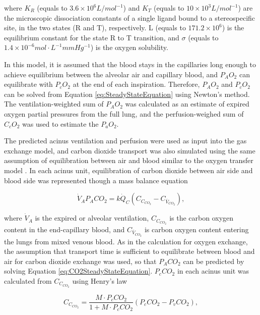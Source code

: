 \noindent where $K_R$ (equals to $3.6 \times 10^6 L/mol^{-1}$) and  $K_T$ (equals to $10 \times 10^3 L/mol^{-1}$) are the microscopic dissociation constants of a single ligand bound to a stereospecific site, in the two states (R and T), respectively. L (equals to $171.2 \times 10^6$) is the equilibrium constant for the state R to T transition, and $\sigma$ (equals to $1.4 \times 10^{-6} mol \cdot L^{-1}mm Hg^{-1}$) is the oxygen solubility.

In this model, it is assumed that the blood stays in the capillaries long enough to achieve equilibrium between the alveolar air and capillary blood, and $P_AO_2$ can equilibrate with $P_cO_2$ at the end of each inspiration. Therefore, $P_AO_2$ and $P_cO_2$ can be solved from Equation \ref{eq:SteadyStateEquation} using Newton’s method. The ventilation-weighted sum of $P_AO_2$ was calculated as an estimate of expired oxygen partial pressures from the full lung, and the perfusion-weighed sum of $C_cO_2$ was used to estimate the $P_aO_2$.

The predicted acinus ventilation and perfusion were used as input into the gas exchange model, and carbon dioxide transport was also simulated using the same assumption of equilibration between air and blood similar to the oxygen transfer model \citep{kapitan1986computer}. In each acinus unit, equilibration of carbon dioxide between air side and blood side was represented though a mass balance equation

\begin{equation} 
 \label{eq:CO2SteadyStateEquation}
 \dot{V}_A P_ACO_2 = k\dot{Q}_C(C_{C_{CO_2}} - C_{\bar{V}_{CO_2}}),
\end{equation}

\noindent where $\dot{V}_A$ is the expired or alveolar ventilation, $C_{C_{CO_2}}$ is the carbon oxygen content in the end-capillary blood, and $C_{\bar{V}_{CO_2}}$ is carbon oxygen content entering the lungs from mixed venous blood. As in the calculation for oxygen exchange, the assumption that transport time is sufficient to equilibrate between blood and air for carbon dioxide exchange was used, so that $P_ACO_2$ can be predicted by solving Equation \ref{eq:CO2SteadyStateEquation}. $P_cCO_2$ in each acinus unit was calculated from $C_{C_{CO_2}}$ using Henry’s law

\begin{equation} 
 \label{eq:CarbonOxygenContent}
 C_{C_{CO_2}} = \frac{M \cdot P_cCO_2}{1+M \cdot P_cCO_2}(P_cCO_2 - P_vCO_2),
\end{equation}

